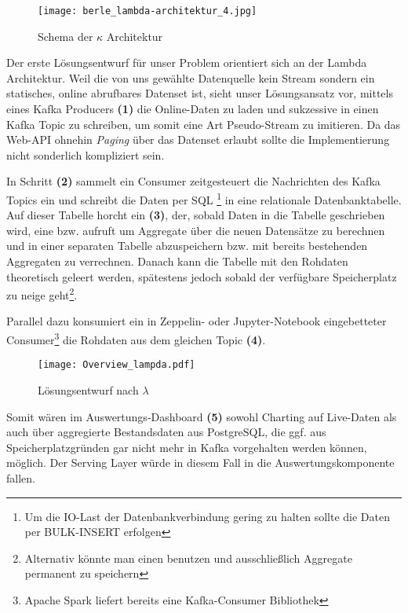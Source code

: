 \begin{description}
\begin{figure}[h]
	\centering
	\texttt{[image: berle\_lambda-architektur\_4.jpg]}
	\caption[Schema der $\kappa$ Architektur]{Schema der $\kappa$ Architektur\autocite{TODO}}
	\label{fig:KappaArchitecture}
\end{figure}

\end{description}

Der erste Lösungsentwurf für unser Problem orientiert sich an der Lambda Architektur. Weil die von uns gewählte Datenquelle kein Stream sondern ein statisches, online abrufbares Datenset ist, sieht unser Lösungsansatz vor, mittels eines Kafka Producers \textbf{(1)} die Online-Daten zu laden und sukzessive in einen Kafka Topic zu schreiben, um somit eine Art Pseudo-Stream zu imitieren. Da das Web-API ohnehin \textit{Paging} über das Datenset erlaubt sollte die Implementierung nicht sonderlich kompliziert sein.

In Schritt \textbf{(2)} sammelt ein Consumer zeitgesteuert die Nachrichten des Kafka Topics ein und schreibt die Daten per SQL  \footnote{Um die IO-Last der Datenbankverbindung gering zu halten sollte die Daten per BULK-INSERT erfolgen} in eine relationale Datenbanktabelle. Auf dieser Tabelle horcht ein  \textbf{(3)}, der, sobald Daten in die Tabelle geschrieben wird, eine  bzw.  aufruft um Aggregate über die neuen Datensätze zu berechnen und in einer separaten Tabelle abzuspeichern bzw. mit bereits bestehenden Aggregaten zu verrechnen. Danach kann die Tabelle mit den Rohdaten theoretisch geleert werden, spätestens jedoch sobald der verfügbare Speicherplatz zu neige geht\footnote{Alternativ könnte man einen  benutzen und ausschließlich Aggregate permanent zu speichern}.

Parallel dazu konsumiert ein in Zeppelin- oder Jupyter-Notebook eingebetteter Consumer\footnote{Apache Spark liefert bereits eine Kafka-Consumer Bibliothek} die Rohdaten aus dem gleichen Topic \textbf{(4)}.

\begin{figure}[h] %
	\centering
	\texttt{[image: Overview\_lampda.pdf]}
	\caption[Lösungsentwurf nach $\lambda$]{Lösungsentwurf nach $\lambda$}
	\label{fig:OurLampdaArchitecture}
\end{figure}

Somit wären im Auswertungs-Dashboard \textbf{(5)} sowohl Charting auf Live-Daten als auch über aggregierte Bestandsdaten aus PostgreSQL, die ggf. aus Speicherplatzgründen gar nicht mehr in Kafka vorgehalten werden können, möglich. Der Serving Layer würde in diesem Fall in die Auswertungskomponente fallen.


